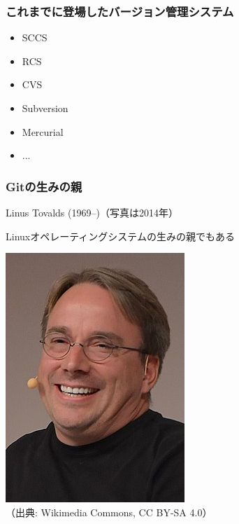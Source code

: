 \documentclass[dvipdfmx]{beamer}
\begin{document}
\begin{frame}
    \frametitle{これまでに登場したバージョン管理システム}
    \large
    \begin{itemize}
        \item SCCS
        \item RCS
        \item CVS
        \item Subversion
        \item Mercurial
        \item ...
    \end{itemize}
\end{frame}

\begin{frame}
    \frametitle{Gitの生みの親}
    \large
    Linus Tovalds (1969--)（写真は2014年）

    Linuxオペレーティングシステムの生みの親でもある

    \begin{center}
        \includegraphics[scale=0.4]{256px-LinuxCon_Europe_Linus_Torvalds_03_(cropped).jpg}
        \\
        \small
        （出典: Wikimedia Commons, CC BY-SA 4.0）
    \end{center}
\end{frame}
\end{document}
